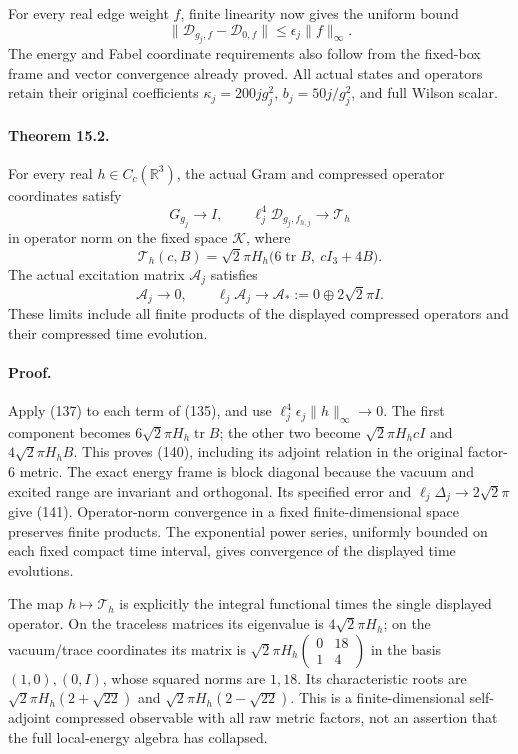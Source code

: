 \documentclass[11pt]{article}
\begin{document}
For every real edge weight $f$, finite linearity now gives the
uniform bound
\[
 \|\mathcal D_{g_j,f}-\mathcal D_{0,f}\|
 \le\epsilon_j\|f\|_\infty.
\]
The energy and Fabel coordinate requirements also follow from the
fixed-box frame and vector convergence already proved.
All actual states and operators retain their original coefficients
$\kappa_j=200jg_j^2$, $b_j=50j/g_j^2$, and full Wilson scalar.

\paragraph{Theorem 15.2.}
For every real $h\in C_c(\mathbb R^3)$, the actual Gram and
compressed operator coordinates satisfy
\[
 G_{g_j}\to I,\qquad
 \ell_j^4\mathcal D_{g_j,f_{h,j}}\to\mathcal T_h
\]
in operator norm on the fixed space $\mathcal K$, where
\begin{equation}\label{eq:local-T}
 \mathcal T_h(c,B)=
 \sqrt2\pi H_h\bigl(6\operatorname{tr}B,\ cI_3+4B\bigr).
\end{equation}
The actual excitation matrix $\mathcal A_j$ satisfies
\begin{equation}\label{eq:local-time}
 \mathcal A_j\to0,\qquad
 \ell_j\mathcal A_j\to
       \mathcal A_*:=0\oplus2\sqrt2\pi I.
\end{equation}
These limits include all finite products of the displayed compressed
operators and their compressed time evolution.

\paragraph{Proof.}
Apply (137) to each term of
(135), and use
$\ell_j^4\epsilon_j\|h\|_\infty\to0$.
The first component becomes $6\sqrt2\pi H_h\operatorname{tr}B$;
the other two become $\sqrt2\pi H_hcI$ and
$4\sqrt2\pi H_hB$. This proves (140), including its
adjoint relation in the original factor-$6$ metric.
The exact energy frame is block diagonal because the vacuum and
excited range are invariant and orthogonal. Its specified error
and $\ell_j\Delta_j\to2\sqrt2\pi$ give (141).
Operator-norm convergence in a fixed finite-dimensional space
preserves finite products. The exponential power series, uniformly
bounded on each fixed compact time interval, gives convergence of
the displayed time evolutions.



The map $h\mapsto\mathcal T_h$ is explicitly the integral functional
times the single displayed operator. On the traceless matrices its
eigenvalue is $4\sqrt2\pi H_h$; on the vacuum/trace coordinates its
matrix is $\sqrt2\pi H_h\left(\begin{smallmatrix}0&18\\1&4\end{smallmatrix}\right)$
in the basis $(1,0),(0,I)$, whose squared norms are $1,18$.
Its characteristic roots are
$\sqrt2\pi H_h(2+\sqrt{22})$ and
$\sqrt2\pi H_h(2-\sqrt{22})$. This is a finite-dimensional
self-adjoint compressed observable with all raw metric factors,
not an assertion that the full local-energy algebra has collapsed.
\end{document}
